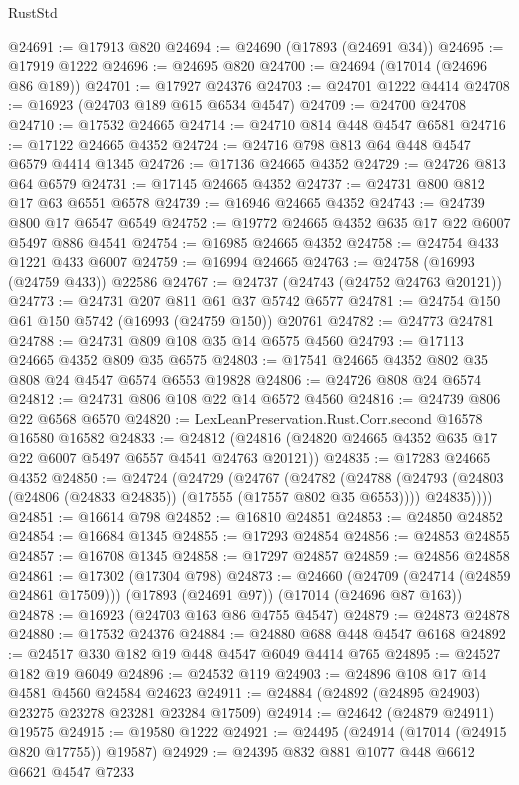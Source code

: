 \begin{lexlean}{RustStd}
\begin{coremodule}
@24691 := @17913 @820
@24694 := @24690 (@17893 (@24691 @34))
@24695 := @17919 @1222
@24696 := @24695 @820
@24700 := @24694 (@17014 (@24696 @86 @189))
@24701 := @17927 @24376
@24703 := @24701 @1222 @4414
@24708 := @16923 (@24703 @189 @615 @6534 @4547)
@24709 := @24700 @24708
@24710 := @17532 @24665
@24714 := @24710 @814 @448 @4547 @6581
@24716 := @17122 @24665 @4352
@24724 := @24716 @798 @813 @64 @448 @4547 @6579 @4414 @1345
@24726 := @17136 @24665 @4352
@24729 := @24726 @813 @64 @6579
@24731 := @17145 @24665 @4352
@24737 := @24731 @800 @812 @17 @63 @6551 @6578
@24739 := @16946 @24665 @4352
@24743 := @24739 @800 @17 @6547 @6549
@24752 := @19772 @24665 @4352 @635 @17 @22 @6007 @5497 @886 @4541
@24754 := @16985 @24665 @4352
@24758 := @24754 @433 @1221 @433 @6007
@24759 := @16994 @24665
@24763 := @24758 (@16993 (@24759 @433)) @22586
@24767 := @24737 (@24743 (@24752 @24763 @20121))
@24773 := @24731 @207 @811 @61 @37 @5742 @6577
@24781 := @24754 @150 @61 @150 @5742 (@16993 (@24759 @150)) @20761
@24782 := @24773 @24781
@24788 := @24731 @809 @108 @35 @14 @6575 @4560
@24793 := @17113 @24665 @4352 @809 @35 @6575
@24803 := @17541 @24665 @4352 @802 @35 @808 @24 @4547 @6574 @6553 @19828
@24806 := @24726 @808 @24 @6574
@24812 := @24731 @806 @108 @22 @14 @6572 @4560
@24816 := @24739 @806 @22 @6568 @6570
@24820 := LexLeanPreservation.Rust.Corr.second @16578 @16580 @16582
@24833 := @24812 (@24816 (@24820 @24665 @4352 @635 @17 @22 @6007 @5497 @6557 @4541 @24763 @20121))
@24835 := @17283 @24665 @4352
@24850 := @24724
    (@24729
      (@24767
        (@24782
          (@24788
            (@24793 (@24803 (@24806 (@24833 @24835)) (@17555 (@17557 @802 @35 @6553))))
            @24835))))
@24851 := @16614 @798
@24852 := @16810 @24851
@24853 := @24850 @24852
@24854 := @16684 @1345
@24855 := @17293 @24854
@24856 := @24853 @24855
@24857 := @16708 @1345
@24858 := @17297 @24857
@24859 := @24856 @24858
@24861 := @17302 (@17304 @798)
@24873 := @24660
    (@24709 (@24714 (@24859 @24861 @17509)))
    (@17893 (@24691 @97))
    (@17014 (@24696 @87 @163))
@24878 := @16923 (@24703 @163 @86 @4755 @4547)
@24879 := @24873 @24878
@24880 := @17532 @24376
@24884 := @24880 @688 @448 @4547 @6168
@24892 := @24517 @330 @182 @19 @448 @4547 @6049 @4414 @765
@24895 := @24527 @182 @19 @6049
@24896 := @24532 @119
@24903 := @24896 @108 @17 @14 @4581 @4560 @24584 @24623
@24911 := @24884 (@24892 (@24895 @24903) @23275 @23278 @23281 @23284 @17509)
@24914 := @24642 (@24879 @24911) @19575
@24915 := @19580 @1222
@24921 := @24495 (@24914 (@17014 (@24915 @820 @17755)) @19587)
@24929 := @24395 @832 @881 @1077 @448 @6612 @6621 @4547 @7233

\end{coremodule}
\end{lexlean}
